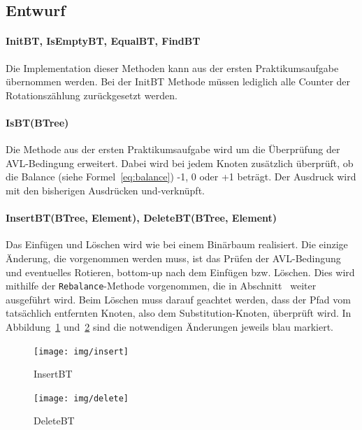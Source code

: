 \subsection{Entwurf}\label{subsec:entwurf2}

\paragraph{InitBT, IsEmptyBT, EqualBT, FindBT}
Die Implementation dieser Methoden kann aus der ersten Praktikumsaufgabe übernommen werden.
Bei der InitBT Methode müssen lediglich alle Counter der Rotationszählung zurückgesetzt werden.

\paragraph{IsBT(BTree)}
Die Methode aus der ersten Praktikumsaufgabe wird um die Überprüfung der
AVL-Bedingung erweitert.
Dabei wird bei jedem Knoten zusätzlich überprüft, ob die Balance (siehe Formel~\ref{eq:balance})
-1, 0 oder +1 beträgt.
Der Ausdruck wird mit den bisherigen Ausdrücken und-verknüpft.

\paragraph{InsertBT(BTree, Element), DeleteBT(BTree, Element)}
Das Einfügen und Löschen wird wie bei einem Binärbaum realisiert.
Die einzige Änderung, die vorgenommen werden muss, ist das Prüfen der
AVL-Bedingung und eventuelles Rotieren, bottom-up nach dem Einfügen bzw. Löschen.
Dies wird mithilfe der \verb|Rebalance|-Methode vorgenommen, die in
Abschnitt~ weiter ausgeführt wird.
Beim Löschen muss darauf geachtet werden, dass der Pfad vom tatsächlich entfernten Knoten, also
dem Substitution-Knoten, überprüft wird.
In Abbildung~\ref{fig:AVL-insert} und~\ref{fig:AVL-delete} sind die notwendigen Änderungen jeweils
blau markiert.

\begin{figure}[p]
    \centering
    \texttt{[image: img/insert]}
    \caption{InsertBT}
    \label{fig:AVL-insert}
\end{figure}
\begin{figure}[p]
    \centering
    \texttt{[image: img/delete]}
    \caption{DeleteBT}
    \label{fig:AVL-delete}
\end{figure}

